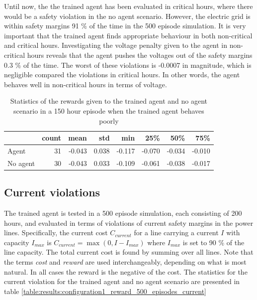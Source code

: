 \documentclass[class=book, crop=false]{standalone}
\begin{document}
Until now, the the trained agent has been evaluated in critical hours, where there would be a safety violation in the no agent scenario. However, the electric grid is within safety margins 91 \% of the time in the 500 episode simulation. It is very important that the trained agent finds appropriate behaviour in both non-critical and critical hours. Investigating the voltage penalty given to the agent in non-critical hours reveals that the agent pushes the voltages out of the safety margins 0.3 \% of the time. The worst of these violations is -0.0007 in magnitude, which is negligible  compared the violations in critical hours. In other words, the agent behaves well in non-critical hours in terms of voltage. 
\begin{table}[h]
\center
\begin{tabular}{l|rrrrrrr}
         & count  & mean   & std   & min    & 25\%   & 50\%   & 75\%   \\
\hline
Agent    & 31    & -0.043 & 0.038 & -0.117 & -0.070 & -0.034 & -0.010 \\
No agent & 30    & -0.043 & 0.033 & -0.109 & -0.061 & -0.038 & -0.017 \\
\hline
\end{tabular}
\caption{Statistics of the rewards given to the trained agent and no agent scenario in a 150 hour episode when the trained agent behaves poorly}
\label{table:results:config1_150hour_bad_voltage}
\end{table}




\subsection{Current violations}\label{section:config1:current_violations}
The trained agent is tested in a 500 episode simulation, each consisting of 200 hours, and evaluated in terms of violations of current safety margins in the power lines. Specifically, the current cost $C_{current}$ for a line carrying a current $I$ with capacity $I_{max}$ is $C_{current} = \max(0,I - I_{max})$ where $I_{max}$ is set to 90 \% of the line capacity. The total current cost is found by summing over all lines. Note that the terms \textit{cost} and \textit{reward} are used interchangeably, depending on what is most natural. In all cases the reward is the negative of the cost. The statistics for the current violation for the trained agent and no agent scenario are presented in table \ref{table:results:configuration1_reward_500_episodes_current}
\end{document}
